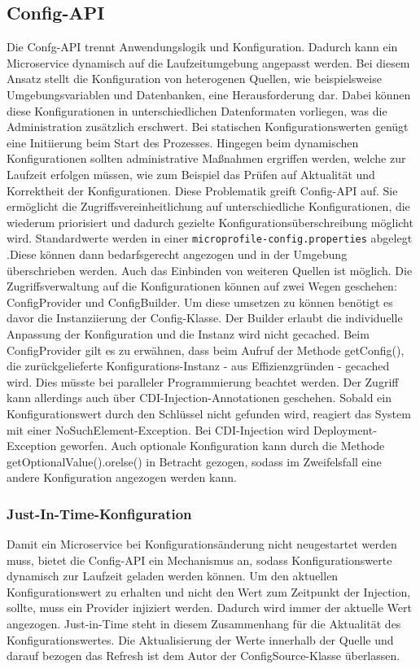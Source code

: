 \subsection{Config-API} 
Die Confg-API trennt Anwendungslogik und Konfiguration. Dadurch kann ein Microservice dynamisch auf die Laufzeitumgebung angepasst werden. Bei diesem Ansatz stellt die Konfiguration von heterogenen Quellen, wie beispielsweise Umgebungsvariablen und Datenbanken, eine Herausforderung dar. Dabei können diese Konfigurationen in unterschiedlichen Datenformaten vorliegen, was die Administration zusätzlich erschwert. Bei statischen Konfigurationswerten genügt eine Initiierung beim Start des Prozesses. Hingegen beim dynamischen Konfigurationen sollten administrative Maßnahmen ergriffen werden, welche zur Laufzeit erfolgen müssen, wie zum Beispiel das Prüfen auf Aktualität und Korrektheit der Konfigurationen. 
Diese Problematik greift Config-API auf. Sie ermöglicht die Zugriffsvereinheitlichung auf unterschiedliche Konfigurationen, die wiederum priorisiert und dadurch gezielte Konfigurationsüberschreibung möglicht wird. Standardwerte werden in einer \texttt{microprofile-config.properties} abgelegt .Diese können dann bedarfsgerecht angezogen und in der Umgebung überschrieben werden. Auch das Einbinden von weiteren Quellen ist möglich.
Die Zugriffsverwaltung auf die Konfigurationen können auf zwei Wegen geschehen: ConfigProvider und ConfigBuilder. Um diese umsetzen zu können benötigt es davor die Instanziierung der Config-Klasse. Der Builder erlaubt die individuelle Anpassung der Konfiguration und die Instanz wird nicht gecached. Beim ConfigProvider gilt es zu erwähnen, dass beim Aufruf der Methode getConfig(), die zurückgelieferte Konfigurations-Instanz - aus Effizienzgründen - gecached wird. Dies müsste bei paralleler Programmierung beachtet werden. Der Zugriff kann allerdings auch über CDI-Injection-Annotationen geschehen. Sobald ein Konfigurationswert durch den Schlüssel nicht gefunden wird, reagiert das System mit einer NoSuchElement-Exception. Bei CDI-Injection wird Deployment-Exception geworfen. Auch optionale Konfiguration kann durch die Methode getOptionalValue().orelse() in Betracht gezogen, sodass im Zweifelsfall eine andere Konfiguration angezogen werden kann. 

\subsubsection{Just-In-Time-Konfiguration} 
Damit ein Microservice bei Konfigurationsänderung nicht neugestartet werden muss, bietet die Config-API ein Mechanismus an, sodass Konfigurationswerte dynamisch zur Laufzeit geladen werden können. Um den aktuellen Konfigurationswert zu erhalten und nicht den Wert zum Zeitpunkt der Injection, sollte, muss ein Provider injiziert werden. Dadurch wird immer der aktuelle Wert angezogen. Just-in-Time steht in diesem Zusammenhang für die Aktualität des Konfigurationswertes. Die Aktualisierung der Werte innerhalb der Quelle und darauf bezogen das Refresh ist dem Autor der ConfigSource-Klasse überlassen. 

